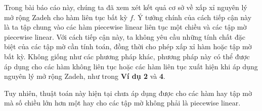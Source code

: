 \documentclass[../report.tex]{subfiles}
\begin{document}
Trong bài báo cáo này, chúng ta đã xem xét kết quả 
cơ sở về xấp xỉ nguyên lý mở rộng Zadeh cho hàm liên tục 
bất kỳ $f$. Ý tưởng chính của cách tiếp cận này 
là ta tập chung vào các hàm piecewise linear liên tục 
một chiều và các tập mờ piecewise linear. Với cách tiếp cận này,
ta không yêu cầu những tính chất đặc biệt của các tập mờ cần 
tính toán, đồng thời cho phép xấp xỉ hàm hoặc tập mờ bất kỳ. 
Không giống như các phương pháp khác, phương pháp này có thể 
được áp dụng cho các hàm không liên tục hoặc các hàm liên tục 
xuất hiện khi áp dụng nguyên lý mở rộng Zadeh, như trong 
\textbf{Ví dụ 2} và \textbf{4}. 

Tuy nhiên, thuật toán này hiện tại chưa áp dụng được cho 
các hàm hay tập mờ mà số chiều lớn hơn một hay cho các tập 
mờ không phải là piecewise linear.
\end{document}
